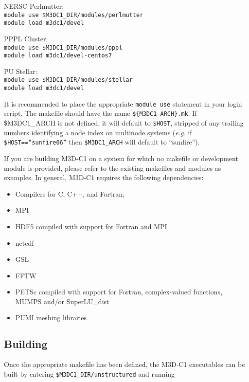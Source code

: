 \begin{description}
\item{NERSC Perlmutter}:\\
  \texttt{module use \$M3DC1\_DIR/modules/perlmutter}\\
  \texttt{module load m3dc1/devel}
\item{PPPL Cluster}:\\
  \texttt{module use \$M3DC1\_DIR/modules/pppl}\\
  \texttt{module load m3dc1/devel-centos7}
\item{PU Stellar}:\\
  \texttt{module use \$M3DC1\_DIR/modules/stellar}\\
  \texttt{module load m3dc1/devel}
\end{description}

It is recommended to place the appropriate \texttt{module use}
statement in your login script.  The makefile should have the name
\texttt{\$\{M3DC1\_ARCH\}.mk}.  If \$M3DC1\_ARCH is not defined, it
will default to \texttt{\$HOST}, stripped of any trailing numbers
identifying a node index on multinode systems (\textit{e.g.} if
\texttt{\$HOST==``sunfire06''} then \texttt{\$M3DC1\_ARCH} will
default to ``sunfire'').

If you are building M3D-C1 on a system for which no makefile or development
module is provided, please refer to the existing makefiles and modules
as examples.  In general, M3D-C1 requires the following dependencies:
\begin{itemize}
\item Compilers for C, C++, and Fortran;
\item MPI
\item HDF5 compiled with support for Fortran and MPI
\item netcdf
\item GSL
\item FFTW
\item PETSc compiled with support for Fortran, complex-valued
  functions, MUMPS and/or SuperLU\_dist
\item PUMI meshing libraries
\end{itemize}

\subsection{Building}

Once the appropriate makefile has been defined, the M3D-C1 executables
can be built by entering \texttt{\$M3DC1\_DIR/unstructured} and
running

